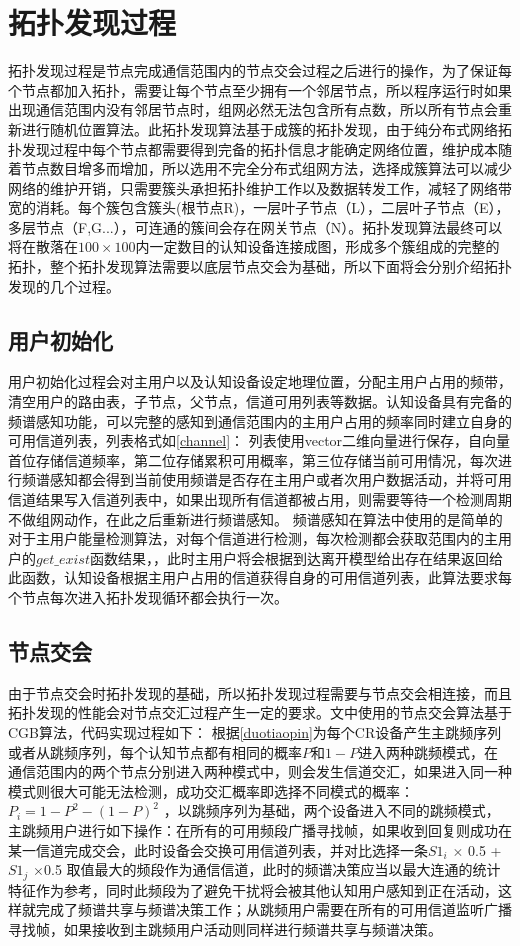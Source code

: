 \documentclass[a4paper,AutoFakeBold,oneside,12pt]{book}
\begin{document}
 \section{拓扑发现过程}
 拓扑发现过程是节点完成通信范围内的节点交会过程之后进行的操作，为了保证每个节点都加入拓扑，需要让每个节点至少拥有一个邻居节点，所以程序运行时如果出现通信范围内没有邻居节点时，组网必然无法包含所有点数，所以所有节点会重新进行随机位置算法。此拓扑发现算法基于成簇的拓扑发现，由于纯分布式网络拓扑发现过程中每个节点都需要得到完备的拓扑信息才能确定网络位置，维护成本随着节点数目增多而增加，所以选用不完全分布式组网方法，选择成簇算法可以减少网络的维护开销，只需要簇头承担拓扑维护工作以及数据转发工作，减轻了网络带宽的消耗。每个簇包含簇头(根节点R)，一层叶子节点（L），二层叶子节点（E），多层节点（F,G...），可连通的簇间会存在网关节点（N）。拓扑发现算法最终可以将在散落在$100\times 100$内一定数目的认知设备连接成图，形成多个簇组成的完整的拓扑，整个拓扑发现算法需要以底层节点交会为基础，所以下面将会分别介绍拓扑发现的几个过程。
 \subsection{用户初始化}
 用户初始化过程会对主用户以及认知设备设定地理位置，分配主用户占用的频带，清空用户的路由表，子节点，父节点，信道可用列表等数据。认知设备具有完备的频谱感知功能，可以完整的感知到通信范围内的主用户占用的频率同时建立自身的可用信道列表，列表格式如\ref{channel}：
 列表使用vector二维向量进行保存，自向量首位存储信道频率，第二位存储累积可用概率，第三位存储当前可用情况，每次进行频谱感知都会得到当前使用频谱是否存在主用户或者次用户数据活动，并将可用信道结果写入信道列表中，如果出现所有信道都被占用，则需要等待一个检测周期不做组网动作，在此之后重新进行频谱感知。
  频谱感知在算法中使用的是简单的对于主用户能量检测算法，对每个信道进行检测，每次检测都会获取范围内的主用户的$get\_exist$函数结果，，此时主用户将会根据到达离开模型给出存在结果返回给此函数，认知设备根据主用户占用的信道获得自身的可用信道列表，此算法要求每个节点每次进入拓扑发现循环都会执行一次。
 \subsection{节点交会}
 由于节点交会时拓扑发现的基础，所以拓扑发现过程需要与节点交会相连接，而且拓扑发现的性能会对节点交汇过程产生一定的要求。文中使用的节点交会算法基于CGB算法，代码实现过程如下：
 根据\ref{duotiaopin}为每个CR设备产生主跳频序列或者从跳频序列，每个认知节点都有相同的概率$P$和$1-P$进入两种跳频模式，在通信范围内的两个节点分别进入两种模式中，则会发生信道交汇，如果进入同一种模式则很大可能无法检测，成功交汇概率即选择不同模式的概率：$P_i=1-P^2-(1-P)^2$
，以跳频序列为基础，两个设备进入不同的跳频模式，主跳频用户进行如下操作：在所有的可用频段广播寻找帧，如果收到回复则成功在某一信道完成交会，此时设备会交换可用信道列表，并对比选择一条$S1_i$ $\times$ 0.5 +$S1_j$ $ \times $0.5 取值最大的频段作为通信信道，此时的频谱决策应当以最大连通的统计特征作为参考，同时此频段为了避免干扰将会被其他认知用户感知到正在活动，这样就完成了频谱共享与频谱决策工作；从跳频用户需要在所有的可用信道监听广播寻找帧，如果接收到主跳频用户活动则同样进行频谱共享与频谱决策。
  
\end{document}
